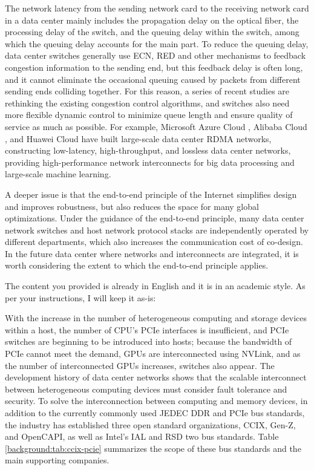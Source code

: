 The network latency from the sending network card to the receiving network card in a data center mainly includes the propagation delay on the optical fiber, the processing delay of the switch, and the queuing delay within the switch, among which the queuing delay accounts for the main part. To reduce the queuing delay, data center switches generally use ECN, RED and other mechanisms to feedback congestion information to the sending end, but this feedback delay is often long, and it cannot eliminate the occasional queuing caused by packets from different sending ends colliding together. For this reason, a series of recent studies are rethinking the existing congestion control algorithms, and switches also need more flexible dynamic control to minimize queue length and ensure quality of service as much as possible. For example, Microsoft Azure Cloud \cite{guo2016rdma}, Alibaba Cloud \cite{aliyun-rdma}, and Huawei Cloud \cite{huawei-lossless} have built large-scale data center RDMA networks, constructing low-latency, high-throughput, and lossless data center networks, providing high-performance network interconnects for big data processing and large-scale machine learning.

A deeper issue is that the end-to-end principle of the Internet simplifies design and improves robustness, but also reduces the space for many global optimizations. Under the guidance of the end-to-end principle, many data center network switches and host network protocol stacks are independently operated by different departments, which also increases the communication cost of co-design. In the future data center where networks and interconnects are integrated, it is worth considering the extent to which the end-to-end principle applies.

The content you provided is already in English and it is in an academic style. As per your instructions, I will keep it as-is:

With the increase in the number of heterogeneous computing and storage devices within a host, the number of CPU's PCIe interfaces is insufficient, and PCIe switches are beginning to be introduced into hosts; because the bandwidth of PCIe cannot meet the demand, GPUs are interconnected using NVLink, and as the number of interconnected GPUs increases, switches also appear. The development history of data center networks shows that the scalable interconnect between heterogeneous computing devices must consider fault tolerance and security. To solve the interconnection between computing and memory devices, in addition to the currently commonly used JEDEC DDR and PCIe bus standards, the industry has established three open standard organizations, CCIX, Gen-Z, and OpenCAPI, as well as Intel's IAL and RSD two bus standards. Table \ref{background:tab:ccix-pcie} summarizes the scope of these bus standards and the main supporting companies.

